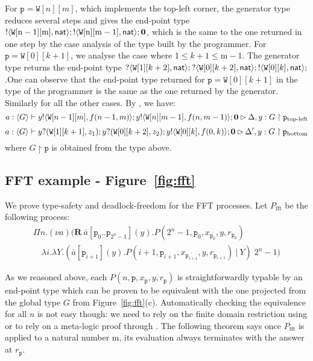 \documentclass{LMCS}
\newcommand{\ptilde}[1]{{\ensuremath{#1}}}
\newcommand{\kf}[1]{\textup{\textsf{#1}}\xspace}
\newcommand{\sr}[4]{\ensuremath{\bar{#1}[#2](#3).#4}}
\newcommand{\pp}{\ensuremath{\at{\p}}}
\newcommand{\participant}[1]{\ensuremath{\mathtt{#1}}}
\newcommand{\p}{\ensuremath{\participant{p}}}
\newcommand{\Y}{\ensuremath{Y}}
\newcommand{\inact}{\ensuremath{\mathbf{0}}}
\newcommand{\at}[1]{\ensuremath{\ptilde{#1}}}
\newcommand{\sep}{\ensuremath{~\mathbf{|}~ }}
\newcommand{\G}{\ensuremath{G}}
\newcommand{\D}{\ensuremath{\Delta}}
\newcommand{\Nat}{\kf{nat}}
\newcommand{\trule}[1]{\text{\footnotesize{\ensuremath{\lfloor\text{\sc{#1}}\rfloor}}}}
\newcommand{\tftrule}[1]{{\text{\footnotesize[\text{\sc{#1}}]}}}
\newcommand{\outS}[3]{\ensuremath{#1!\langle #2\rangle;#3}}
\newcommand{\inpS}[3]{\ensuremath{#1?( #2);#3}}
\newcommand{\Lout}[3]{\ensuremath{!\langle #1,#2\rangle;#3}}
\newcommand{\Lin}[3]{\ensuremath{?\langle #1,#2\rangle;#3}}
\newcommand{\APP}{\;}
\newcommand{\mar}[1]{\ensuremath{\langle #1 \rangle}}
\newcommand{\y}{\ensuremath{y}}
\newcommand{\ii}{\ensuremath{i}}
\newcommand{\n}{\ensuremath{\mathrm{n}}}
\newcommand{\m}{\ensuremath{\mathrm{m}}}
\newcommand{\W}{\ensuremath{\mathtt{W}}}
\newcommand{\proj}[1]{\ensuremath{\upharpoonright #1}}
\begin{document}
For $\p=\W[n][m]$, which implements the top-left corner, the generator type
reduces several steps and gives the end-point type
$\Lout{\W[\n-1][\m]}{\Nat}{\Lout{\W[\n][\m-1]} {\Nat}{\inact}}$, which is the same to
the one returned in one step by the case analysis of the type built by the
programmer. For $\p=\W[0][k+1]$, we analyse the case where $1 \leq k+1 \leq \m-1$. The generator type returns the end-point type
\Lin{\W[1][k+2]}{\Nat}{\Lin{\W[0][k+2]}{\Nat}\Lout{\W[0][k]}{\Nat}}.One can observe that the end-point type returned for $\p=\W[0][k+1]$ in the type of the
programmer is the same as the one returned by the generator. Similarly for all
the other cases. 
By \tftrule{TOut, TIn}, we have: 
{\small
\[ 
a:\mar{\G} \vdash \outS{y}{\W[n-1][m], f(n-1,m)}\outS{y}{\W[n][m-1], f(n,m-1)}{\inact}
  \rhd \D,\y:\G \proj{\p_{\text{top-left}}}
  \]
  \[
a:\mar{\G} \vdash \inpS{y}{\W[1][k+1], z_1}\inpS{y}{\W[0][k+2], z_2}\outS{y}{\W[0][k], f(0,k)}\inact \rhd \D', \y :\G \proj{\p_{\text{bottom}}}\\
\]
}
where $\G \proj{\p}$ is obtained from the type above. 


\subsection{FFT example - Figure~\ref{fig:fft}}
\noindent 
\label{subsec:fft:typing}
We prove
type-safety and deadlock-freedom for the FFT processes.  
Let $P_{\text{fft}}$ be the following process:
{\small
\[
\begin{array}{lll}
\Pi n.(\nu a)(
\mathbf{R} \ \sr{a}{\p_0..\p_{2^n-1}}{y}{P(2^n-1,\p_0,x_{\overline{\p_0}},y,r_{\p_0})}\\[1mm]
\quad \lambda{\ii}.\lambda {\Y}.
{(\sr{a}{\p_{\ii+1}}{y}{P({\ii+1},\p_{\ii+1},x_{\overline{\p_{\ii+1}}},y,r_{\p_{\ii+1}})}
\sep \Y)}\APP 2^n-1)
\end{array}
\] 
}

\noindent
As we reasoned above, each $P(n,\p,x_{\overline{\p}},y,r_\pp)$ is
straightforwardly typable by an end-point type which can be proven to be
equivalent with the one projected from the global type $G$ from
Figure~\ref{fig:fft}(c). Automatically checking the equivalence for all $n$ is
not easy though: we need to rely on the finite domain restriction using
\trule{WfRecF} or to rely on a meta-logic proof through \trule{WfRecExt}.
The following theorem says once $P_{\text{fft}}$ is applied 
to a natural number $\m$, its evaluation always 
terminates with the answer at $r_\pp$.
\end{document}
